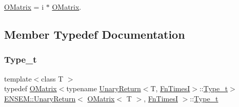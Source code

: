 \mbox{\hyperlink{classENSEM_1_1OMatrix}{O\+Matrix}} = i $\ast$ \mbox{\hyperlink{classENSEM_1_1OMatrix}{O\+Matrix}}. 

\subsection{Member Typedef Documentation}
\mbox{\label{structENSEM_1_1UnaryReturn_3_01OMatrix_3_01T_01_4_00_01FnTimesI_01_4_a823208991719b80307ceb78f0448f0de}} 
\subsubsection{\texorpdfstring{Type\_t}{Type\_t}\hspace{0.1cm}{\footnotesize\ttfamily [1/2]}}
{\footnotesize\ttfamily template$<$class T $>$ \\
typedef \mbox{\hyperlink{classENSEM_1_1OMatrix}{O\+Matrix}}$<$typename \mbox{\hyperlink{structENSEM_1_1UnaryReturn}{Unary\+Return}}$<$T, \mbox{\hyperlink{structENSEM_1_1FnTimesI}{Fn\+TimesI}}$>$\+::\mbox{\hyperlink{structENSEM_1_1UnaryReturn_3_01OMatrix_3_01T_01_4_00_01FnTimesI_01_4_a823208991719b80307ceb78f0448f0de}{Type\+\_\+t}}$>$ \mbox{\hyperlink{structENSEM_1_1UnaryReturn}{E\+N\+S\+E\+M\+::\+Unary\+Return}}$<$ \mbox{\hyperlink{classENSEM_1_1OMatrix}{O\+Matrix}}$<$ T $>$, \mbox{\hyperlink{structENSEM_1_1FnTimesI}{Fn\+TimesI}} $>$\+::\mbox{\hyperlink{structENSEM_1_1UnaryReturn_3_01OMatrix_3_01T_01_4_00_01FnTimesI_01_4_a823208991719b80307ceb78f0448f0de}{Type\+\_\+t}}}

\mbox{\label{structENSEM_1_1UnaryReturn_3_01OMatrix_3_01T_01_4_00_01FnTimesI_01_4_a823208991719b80307ceb78f0448f0de}} 
